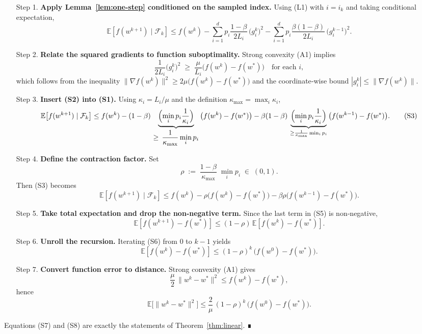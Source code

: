 \documentclass{article}
\newcommand{\E}{\mathbb{E}}
\begin{document}
\begin{enumerate}
\item[Step 1.] \textbf{Apply Lemma~\ref{lem:one-step} conditioned on the
sampled index.}  Using (L1) with \(i=i_{k}\) and taking conditional
expectation,
\[
\E\!\left[f(w^{k+1})\mid\mathcal{F}_{k}\right]
\le f(w^{k})-
\sum_{i=1}^{d}p_{i}\frac{1-\beta}{2L_{i}}\,\bigl(g_{i}^{k}\bigr)^{2}
-
\sum_{i=1}^{d}p_{i}\frac{\beta(1-\beta)}{2L_{i}}\,
      \bigl(g_{i}^{k-1}\bigr)^{2}.
\tag{S1}
\]

\item[Step 2.] \textbf{Relate the squared gradients to function suboptimality.}
Strong convexity (A1) implies
\[
\frac{1}{2L_{i}}\bigl(g_{i}^{k}\bigr)^{2}
\;\ge\;
\frac{\mu}{L_{i}}\bigl(f(w^{k})-f(w^{*})\bigr)
\quad\text{for each }i,
\tag{S2}
\]
which follows from the inequality
\(\|\nabla f(w^{k})\|^{2}\ge 2\mu\bigl(f(w^{k})-f(w^{*})\bigr)\) and the
coordinate‑wise bound \(|g_{i}^{k}|\le \|\nabla f(w^{k})\|\).

\item[Step 3.] \textbf{Insert (S2) into (S1).}
Using \(\kappa_{i}=L_{i}/\mu\) and the definition
\(\kappa_{\max}=\max_{i}\kappa_{i}\),
\[
\E\!\left[f(w^{k+1})\mid\mathcal{F}_{k}\right]
\le f(w^{k})-
(1-\beta)\,\underbrace{\Bigl(\min_{i}p_{i}\frac{1}{\kappa_{i}}\Bigr)}_{\displaystyle
\ge\,\frac{1}{\kappa_{\max}}\min_{i}p_{i}}\,
\bigl(f(w^{k})-f(w^{*})\bigr)
-
\beta(1-\beta)\,\underbrace{\Bigl(\min_{i}p_{i}\frac{1}{\kappa_{i}}\Bigr)}_{\ge
\frac{1}{\kappa_{\max}}\min_{i}p_{i}}\,
\bigl(f(w^{k-1})-f(w^{*})\bigr).
\tag{S3}
\]

\item[Step 4.] \textbf{Define the contraction factor.}
Set
\[
\rho\;:=\;\frac{1-\beta}{\kappa_{\max}}\;\min_{i}p_{i}\;\in\;(0,1).
\tag{S4}
\]
Then (S3) becomes
\[
\E\!\left[f(w^{k+1})\mid\mathcal{F}_{k}\right]
\le f(w^{k})-\rho\bigl(f(w^{k})-f(w^{*})\bigr)
      -\beta\rho\bigl(f(w^{k-1})-f(w^{*})\bigr).
\tag{S5}
\]

\item[Step 5.] \textbf{Take total expectation and drop the non‑negative term.}
Since the last term in (S5) is non‑negative,
\[
\E\!\left[f(w^{k+1})-f(w^{*})\right]
\le (1-\rho)\,\E\!\left[f(w^{k})-f(w^{*})\right].
\tag{S6}
\]

\item[Step 6.] \textbf{Unroll the recursion.}
Iterating (S6) from \(0\) to \(k-1\) yields
\[
\E\!\left[f(w^{k})-f(w^{*})\right]
\le (1-\rho)^{k}\,\bigl(f(w^{0})-f(w^{*})\bigr).
\tag{S7}
\]

\item[Step 7.] \textbf{Convert function error to distance.}
Strong convexity (A1) gives
\[
\frac{\mu}{2}\,\|w^{k}-w^{*}\|^{2}
\le f(w^{k})-f(w^{*}),
\]
hence
\[
\E\!\bigl[\|w^{k}-w^{*}\|^{2}\bigr]
\le \frac{2}{\mu}\,(1-\rho)^{k}\,
      \bigl(f(w^{0})-f(w^{*})\bigr).
\tag{S8}
\]

\end{enumerate}
Equations (S7) and (S8) are exactly the statements of
Theorem~\ref{thm:linear}.  ∎
\end{document}
